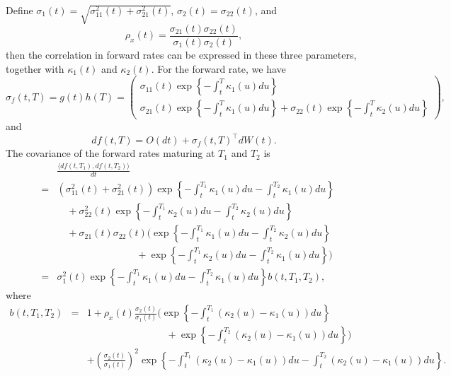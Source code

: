 \documentclass[12pt]{article}
\begin{document}
  Define
  $\sigma_1(t)=\sqrt{\sigma_{11}^2(t)+\sigma_{21}^2(t)}$, $\sigma_2(t)=\sigma_{22}(t)$, and
  \begin{equation}
    \rho_x(t)=\frac{\sigma_{21}(t)\sigma_{22}(t)}{\sigma_1(t)\sigma_2(t)},
  \end{equation}
  then the correlation in forward rates can be expressed in these three parameters, together with $\kappa_1(t)$
  and $\kappa_2(t)$. For the forward rate, we have
  \begin{equation}
    \sigma_f(t,T)=g(t)h(T)=\left(
            \begin{array}{l}
              \sigma_{11}(t)\exp\left\{-\int_t^T\kappa_1(u)du\right\}\\
              \sigma_{21}(t)\exp\left\{-\int_t^T\kappa_1(u)du\right\}+\sigma_{22}(t)\exp\left\{-\int_t^T\kappa_2(u)du\right\}
            \end{array}
         \right),
  \end{equation}
  and
  \begin{equation}
    df(t,T)=O(dt)+\sigma_f(t,T)^{{\top}}dW(t).
  \end{equation}
  The covariance of the forward rates maturing at $T_1$ and $T_2$ is
  \begin{eqnarray}
    && \frac{\langle df(t,T_1), df(t,T_2)\rangle}{dt} \nonumber\\
    &=& \left(\sigma_{11}^2(t)+\sigma_{21}^2(t)\right)\exp\left\{-\int_t^{T_1}\kappa_1(u)du-\int_t^{T_2}\kappa_1(u)du\right\}\nonumber\\
    && \quad +\sigma_{22}^2(t)\exp\left\{-\int_t^{T_1}\kappa_2(u)du-\int_t^{T_2}\kappa_2(u)du\right\}\nonumber\\
    && \quad +\sigma_{21}(t)\sigma_{22}(t)\Bigg(\exp\left\{-\int_t^{T_1}\kappa_1(u)du-\int_t^{T_2}\kappa_2(u)du\right\} \nonumber\\
    && \quad\quad\quad\quad\quad\quad\quad\quad +\exp\left\{-\int_t^{T_1}\kappa_2(u)du-\int_t^{T_2}\kappa_1(u)du\right\}\Bigg)\nonumber\\
    &=& \sigma_1^2(t)\exp\left\{-\int_t^{T_1}\kappa_1(u)du-\int_t^{T_2}\kappa_1(u)du\right\}b(t,T_1,T_2),
  \end{eqnarray}
  where
  \begin{eqnarray}
    b(t,T_1,T_2)&=&1+\rho_x(t)\frac{\sigma_2(t)}{\sigma_1(t)}\Bigg(\exp\left\{-\int_t^{T_1}\left(\kappa_2(u)-\kappa_1(u)\right)du\right\}\nonumber\\
                && \quad\quad\quad\quad\quad\quad\quad\quad +\exp\left\{-\int_t^{T_2}\left(\kappa_2(u)-\kappa_1(u)\right)du\right\}\Bigg)\nonumber\\
                && +\left(\frac{\sigma_2(t)}{\sigma_1(t)}\right)^2\exp\left\{-\int_t^{T_1}\left(\kappa_2(u)-\kappa_1(u)\right)du
                                                                            -\int_t^{T_2}\left(\kappa_2(u)-\kappa_1(u)\right)du\right\}.
  \end{eqnarray}
\end{document}
